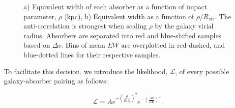 \documentclass[iop]{emulateapj-rtx4}
\begin{document}
\begin{figure}[t]
\centering
{}
\caption{\small{a) Equivalent width of each absorber as a function of impact parameter, $\rho$ (kpc), b) Equivalent width as a function of $\rho/R_{vir}$. The anti-correlation is strongest when scaling $\rho$ by the galaxy virial radius. Absorbers are separated into red and blue-shifted samples based on $\Delta v$. Bins of mean $EW$ are overplotted in red-dashed, and blue-dotted lines for their respective samples.}}
\vspace{5pt}
\end{figure}

To facilitate this decision, we introduce the likelihood, $\mathcal{L}$, of every possible galaxy-absorber pairing as follows:

\begin{equation}
	\mathcal{L} = A e^{-(\frac{\rho}{R_{eff}})^2} e^{-(\frac{\Delta v}{200})^2}.
\end{equation}
\end{document}
